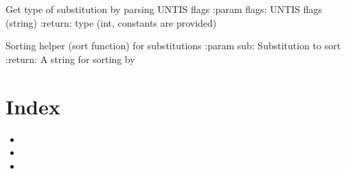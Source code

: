 \documentclass[letterpaper,10pt,ngerman]{sphinxmanual}
\begin{document}

\begin{fulllineitems}
\label{\detokenize{index:untisconnect.sub.parse_type_of_untis_flags}}
Get type of substitution by parsing UNTIS flags
:param flags: UNTIS flags (string)
:return: type (int, constants are provided)

\end{fulllineitems}


\begin{fulllineitems}
\label{\detokenize{index:untisconnect.sub.substitutions_sorter}}
Sorting helper (sort function) for substitutions
:param sub: Substitution to sort
:return: A string for sorting by

\end{fulllineitems}



\chapter{Index}
\label{\detokenize{index:index}}\begin{itemize}
\item {} 

\item {} 

\item {} 

\end{itemize}


\renewcommand{\indexname}{Python-Modulindex}
\begin{sphinxtheindex}
\let\bigletter\sphinxstyleindexlettergroup
\bigletter{u}
\item\relax{}
\item\relax{}
\end{sphinxtheindex}

\renewcommand{\indexname}{Stichwortverzeichnis}
\printindex
\end{document}

